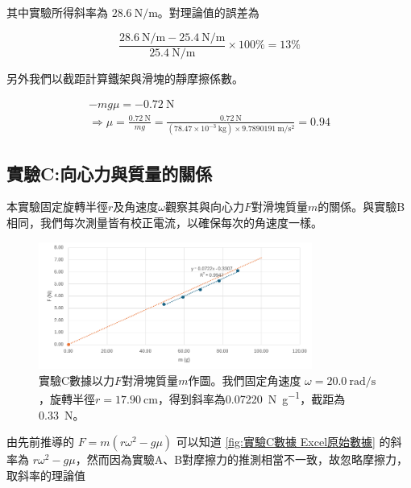 \documentclass[11pt,a4paper]{article}
\theoremstyle{definition}
\begin{document}
            其中實驗所得斜率為 $\SI{28.6}{\newton\per\meter}$。對理論值的誤差為

            \begin{equation} 
                \frac{\SI{28.6}{\newton\per\meter} - \SI{25.4}{\newton\per\meter}}{\SI{25.4}{\newton\per\meter}} \times 100\% = 13\% 
            \end{equation}

            另外我們以截距計算鐵架與滑塊的靜摩擦係數。

            \begin{gather}
                -mg\mu = \SI{-0.72}{\newton}\\
                \Rightarrow \mu = \frac{\SI{0.72}{\newton}}{mg} = \frac{0.72\ \si{\newton}}{(78.47 \times 10^{-3}\ \si{\kilogram}) \times 9.789 019 1\ \si{\meter\per\second\squared}} = 0.94
            \end{gather}

        \subsection{實驗C:向心力與質量的關係}

            本實驗固定旋轉半徑$r$及角速度$\omega$觀察其與向心力$F$對滑塊質量$m$的關係。與實驗B相同，我們每次測量皆有校正電流，以確保每次的角速度一樣。

            \begin{figure}[H]
                \centering
                \includegraphics[width=0.8\textwidth]{實驗C數據.png}
                \caption{實驗C數據以力$F$對滑塊質量$m$作圖。我們固定角速度 $\omega = \SI{20.0}{\radian\per\second}$ ，旋轉半徑$r = \SI{17.90}{\centi\meter}$，得到斜率為\SI{0.07220}{\newton\per\gram}，截距為\SI{0.33}{\newton}。}
                \label{fig:實驗C數據 Excel原始數據}
            \end{figure}
                        
            由先前推導的 $F = m (r\omega^2 - g \mu)$ 可以知道 \autoref{fig:實驗C數據 Excel原始數據} 的斜率為 $r\omega^2 - g \mu$，然而因為實驗A、B對摩擦力的推測相當不一致，故忽略摩擦力，取斜率的理論值
\end{document}
